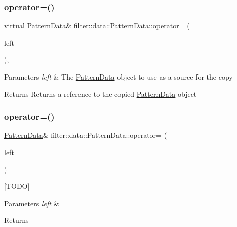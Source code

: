 \subsubsection{\texorpdfstring{operator=()}{operator=()}\hspace{0.1cm}{\footnotesize\ttfamily [1/2]}}
{\footnotesize\ttfamily virtual \hyperlink{classfilter_1_1data_1_1_pattern_data}{Pattern\+Data}\& filter\+::data\+::\+Pattern\+Data\+::operator= (\begin{DoxyParamCaption}\item[{const \hyperlink{classfilter_1_1data_1_1_pattern_data}{Pattern\+Data} \&}]{left }\end{DoxyParamCaption})\hspace{0.3cm}{\ttfamily [inline]}, {\ttfamily [virtual]}}


\begin{DoxyParams}{Parameters}
{\em left} & The \hyperlink{classfilter_1_1data_1_1_pattern_data}{Pattern\+Data} object to use as a source for the copy \\
\hline
\end{DoxyParams}
\begin{DoxyReturn}{Returns}
Returns a reference to the copied \hyperlink{classfilter_1_1data_1_1_pattern_data}{Pattern\+Data} object 
\end{DoxyReturn}
\mbox{\label{classfilter_1_1data_1_1_pattern_data_a1a32234b0caa236a546dea6ba5ba028f}} 
\subsubsection{\texorpdfstring{operator=()}{operator=()}\hspace{0.1cm}{\footnotesize\ttfamily [2/2]}}
{\footnotesize\ttfamily \hyperlink{classfilter_1_1data_1_1_pattern_data}{Pattern\+Data}\& filter\+::data\+::\+Pattern\+Data\+::operator= (\begin{DoxyParamCaption}\item[{const \hyperlink{classfilter_1_1data_1_1_data}{Data} \&}]{left }\end{DoxyParamCaption})\hspace{0.3cm}{\ttfamily [inline]}}

\mbox{[}T\+O\+DO\mbox{]} 
\begin{DoxyParams}{Parameters}
{\em left} & \\
\hline
\end{DoxyParams}
\begin{DoxyReturn}{Returns}

\end{DoxyReturn}
\mbox{\label{classfilter_1_1data_1_1_pattern_data_ae955f8086b628629ca8f380fb2ab540f}} 
